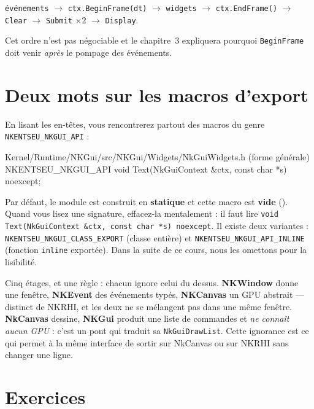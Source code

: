 \begin{nkretenir}
\texttt{événements} $\rightarrow$ \texttt{ctx.BeginFrame(dt)} $\rightarrow$
\texttt{widgets} $\rightarrow$ \texttt{ctx.EndFrame()} $\rightarrow$
\texttt{Clear} $\rightarrow$ \texttt{Submit} $\times 2$ $\rightarrow$
\texttt{Display}.

Cet ordre n'est pas négociable et le chapitre~3 expliquera pourquoi
\texttt{BeginFrame} doit venir \emph{après} le pompage des événements.
\end{nkretenir}

\section{Deux mots sur les macros d'export}

En lisant les en-têtes, vous rencontrerez partout des macros du genre
\texttt{NKENTSEU\_NKGUI\_API} :

\begin{nkcode}{Kernel/Runtime/NKGui/src/NKGui/Widgets/NkGuiWidgets.h (forme générale)}
NKENTSEU_NKGUI_API void Text(NkGuiContext &ctx, const char *s) noexcept;
\end{nkcode}

Par défaut, le module est construit en \textbf{statique} et cette macro est
\textbf{vide} (). Quand
vous lisez une signature, effacez-la mentalement : il faut lire
\texttt{void Text(NkGuiContext \&ctx, const char *s) noexcept}. Il existe deux
variantes : \texttt{NKENTSEU\_NKGUI\_CLASS\_EXPORT} (classe entière) et
\texttt{NKENTSEU\_NKGUI\_API\_INLINE} (fonction \texttt{inline} exportée). Dans
la suite de ce cours, nous les omettons pour la lisibilité.

\begin{nkbilan}
Cinq étages, et une règle : chacun ignore celui du dessus. \textbf{NKWindow}
donne une fenêtre, \textbf{NKEvent} des événements typés, \textbf{NKCanvas} un
GPU abstrait --- distinct de NKRHI, et les deux ne se mélangent pas dans une
même fenêtre. \textbf{NkCanvas} dessine, \textbf{NKGui} produit une liste de
commandes et \emph{ne connaît aucun GPU} : c'est un pont qui traduit sa
\texttt{NkGuiDrawList}. Cette ignorance est ce qui permet à la même interface de
sortir sur NkCanvas ou sur NKRHI sans changer une ligne.
\end{nkbilan}

\section{Exercices}

